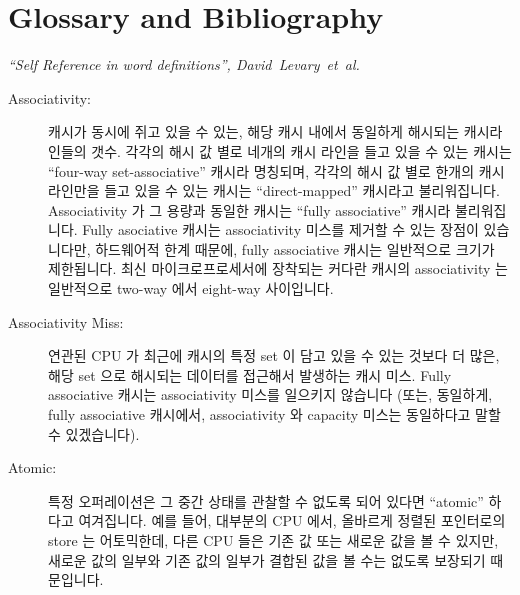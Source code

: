 
\chapter{Glossary and Bibliography}
%
	 {\emph{``Self Reference in word definitions'',
	        David~Levary~et~al.}}

\begin{description}
\item[Associativity:]
	캐시가 동시에 쥐고 있을 수 있는, 해당 캐시 내에서 동일하게 해시되는
	캐시라인들의 갯수.
	각각의 해시 값 별로 네개의 캐시 라인을 들고 있을 수 있는 캐시는
	``four-way set-associative'' 캐시라 명칭되며, 각각의 해시 값 별로
	한개의 캐시 라인만을 들고 있을 수 있는 캐시는 ``direct-mapped''
	캐시라고 불리워집니다.
	Associativity 가 그 용량과 동일한 캐시는 ``fully associative'' 캐시라
	불리워집니다.
	Fully asociative 캐시는 associativity 미스를 제거할 수 있는 장점이
	있습니다만, 하드웨어적 한계 때문에, fully associative 캐시는 일반적으로
	크기가 제한됩니다.
	최신 마이크로프로세서에 장착되는 커다란 캐시의 associativity 는
	일반적으로 two-way 에서 eight-way 사이입니다.
	\iffalse

	The number of cache lines that can be held simultaneously in
	a given cache, when all of these cache lines hash identically
	in that cache.
	A cache that could hold four cache lines for each possible
	hash value would be termed a ``four-way set-associative'' cache,
	while a cache that could hold only one cache line for each
	possible hash value would be termed a ``direct-mapped'' cache.
	A cache whose associativity was equal to its capacity would
	be termed a ``fully associative'' cache.
	Fully associative caches have the advantage of eliminating
	associativity misses, but, due to hardware limitations,
	fully associative caches are normally quite limited in size.
	The associativity of the large caches found on modern microprocessors
	typically range from two-way to eight-way.
	\fi
\item[Associativity Miss:]
	연관된 CPU 가 최근에 캐시의 특정 set 이 담고 있을 수 있는 것보다 더
	많은, 해당 set 으로 해시되는 데이터를 접근해서 발생하는 캐시 미스.
	Fully associative 캐시는 associativity 미스를 일으키지 않습니다 (또는,
	동일하게, fully associative 캐시에서, associativity 와 capacity 미스는
	동일하다고 말할 수 있겠습니다).
	\iffalse

	A cache miss incurred because the corresponding CPU has recently
	accessed more data hashing to a given set of the cache than will
	fit in that set.
	Fully associative caches are not subject to associativity misses
	(or, equivalently, in fully associative caches, associativity
	and capacity misses are identical).
	\fi
\item[Atomic:]
	특정 오퍼레이션은 그 중간 상태를 관찰할 수 없도록 되어 있다면
	``atomic'' 하다고 여겨집니다.
	예를 들어, 대부분의 CPU 에서, 올바르게 정렬된 포인터로의 store 는
	어토믹한데, 다른 CPU 들은 기존 값 또는 새로운 값을 볼 수 있지만, 새로운
	값의 일부와 기존 값의 일부가 결합된 값을 볼 수는 없도록 보장되기
	때문입니다.
	\iffalse


\end{description}
